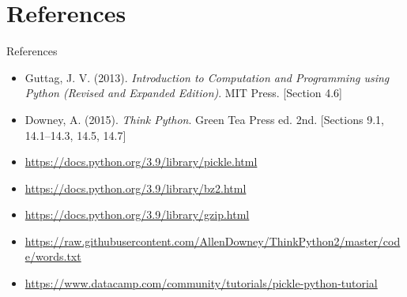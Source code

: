 \documentclass[t,handout,9pt]{beamer}
\begin{document}
\section{References}
\begin{frame}{References}
\begin{itemize}
	\item Guttag, J. V. (2013). \textit{Introduction to Computation and Programming using Python (Revised and Expanded Edition)}. MIT Press. [Section 4.6]
	\item Downey, A. (2015). \textit{Think Python}. Green Tea Press ed. 2nd. [Sections 9.1, 14.1--14.3, 14.5, 14.7]
	\item \url{https://docs.python.org/3.9/library/pickle.html}
	\item \url{https://docs.python.org/3.9/library/bz2.html}
	\item \url{https://docs.python.org/3.9/library/gzip.html}
	\item \url{https://raw.githubusercontent.com/AllenDowney/ThinkPython2/master/code/words.txt}
	\item \url{https://www.datacamp.com/community/tutorials/pickle-python-tutorial}
\end{itemize}
\end{frame}
%

\end{document}
